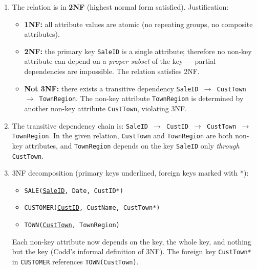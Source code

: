 \documentclass[11pt]{article}
\begin{document}
\begin{corrige}
\begin{enumerate}
\item The relation is in \textbf{2NF} (highest normal form satisfied). Justification:
\begin{itemize}
\item \textbf{1NF:} all attribute values are atomic (no repeating groups, no composite attributes).
\item \textbf{2NF:} the primary key \texttt{SaleID} is a single attribute; therefore no non-key attribute can depend on a \emph{proper subset} of the key — partial dependencies are impossible. The relation satisfies 2NF.
\item \textbf{Not 3NF:} there exists a transitive dependency \texttt{SaleID $\rightarrow$ CustTown $\rightarrow$ TownRegion}. The non-key attribute \texttt{TownRegion} is determined by another non-key attribute \texttt{CustTown}, violating 3NF.
\end{itemize}
\item The transitive dependency chain is: \texttt{SaleID $\rightarrow$ CustID $\rightarrow$ CustTown $\rightarrow$ TownRegion}. In the given relation, \texttt{CustTown} and \texttt{TownRegion} are both non-key attributes, and \texttt{TownRegion} depends on the key \texttt{SaleID} only \emph{through} \texttt{CustTown}.
\item 3NF decomposition (primary keys underlined, foreign keys marked with *):
\begin{itemize}
\item \texttt{SALE(\underline{SaleID}, Date, CustID*)}
\item \texttt{CUSTOMER(\underline{CustID}, CustName, CustTown*)}
\item \texttt{TOWN(\underline{CustTown}, TownRegion)}
\end{itemize}
Each non-key attribute now depends on the key, the whole key, and nothing but the key (Codd's informal definition of 3NF). The foreign key \texttt{CustTown*} in \texttt{CUSTOMER} references \texttt{TOWN(CustTown)}.
\end{enumerate}
\end{corrige}
\end{document}
